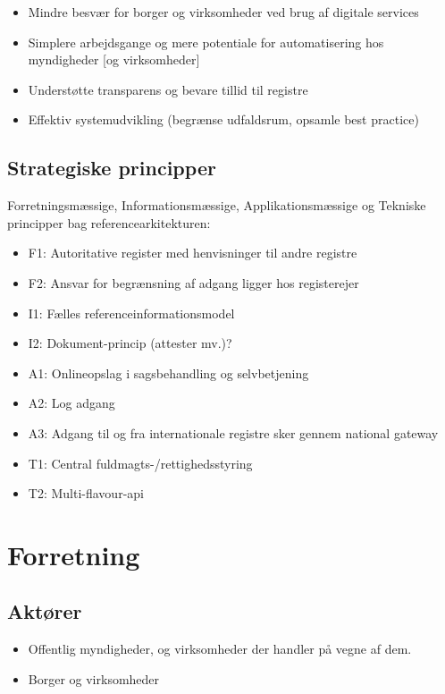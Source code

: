 \begin{itemize}
\tightlist
\item
  Mindre besvær for borger og virksomheder ved brug af digitale services
\item
  Simplere arbejdsgange og mere potentiale for automatisering hos
  myndigheder {[}og virksomheder{]}
\item
  Understøtte transparens og bevare tillid til registre
\item
  Effektiv systemudvikling (begrænse udfaldsrum, opsamle best practice)
\end{itemize}

\subsection{Strategiske principper}\label{strategiske-principper}

Forretningsmæssige, Informationsmæssige, Applikationsmæssige og Tekniske
principper bag referencearkitekturen:

\begin{itemize}
\tightlist
\item
  F1: Autoritative register med henvisninger til andre registre
\item
  F2: Ansvar for begrænsning af adgang ligger hos registerejer
\item
  I1: Fælles referenceinformationsmodel
\item
  I2: Dokument-princip (attester mv.)?
\item
  A1: Onlineopslag i sagsbehandling og selvbetjening
\item
  A2: Log adgang
\item
  A3: Adgang til og fra internationale registre sker gennem national
  gateway
\item
  T1: Central fuldmagts-/rettighedsstyring
\item
  T2: Multi-flavour-api
\end{itemize}

\section{Forretning}\label{forretning}

\subsection{Aktører}\label{aktuxf8rer}

\begin{itemize}
\tightlist
\item
  Offentlig myndigheder, og virksomheder der handler på vegne af dem.
\item
  Borger og virksomheder
\end{itemize}


